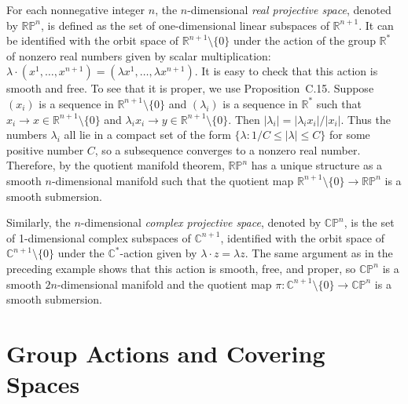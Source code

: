 \begin{example}\label{ex:real-projective-spaces}

For each nonnegative integer $n$, the $n$-dimensional \textit{real projective space}, denoted by $\mathbb{RP}^n$, is defined as the set of one-dimensional linear subspaces of $\mathbb{R}^{n+1}$. It can be identified with the orbit space of $\mathbb{R}^{n+1} \setminus \{0\}$ under the action of the group $\mathbb{R}^*$ of nonzero real numbers given by scalar multiplication: $\lambda \cdot (x^1, \ldots, x^{n+1}) = (\lambda x^1, \ldots, \lambda x^{n+1})$. It is easy to check that this action is smooth and free. To see that it is proper, we use Proposition~C.15. Suppose $(x_i)$ is a sequence in $\mathbb{R}^{n+1} \setminus \{0\}$ and $(\lambda_i)$ is a sequence in $\mathbb{R}^*$ such that $x_i \to x \in \mathbb{R}^{n+1} \setminus \{0\}$ and $\lambda_i x_i \to y \in \mathbb{R}^{n+1} \setminus \{0\}$. Then $|\lambda_i| = |\lambda_i x_i|/|x_i|$. Thus the numbers $\lambda_i$ all lie in a compact set of the form $\{\lambda : 1/C \le |\lambda| \le C\}$ for some positive number $C$, so a subsequence converges to a nonzero real number. Therefore, by the quotient manifold theorem, $\mathbb{RP}^n$ has a unique structure as a smooth $n$-dimensional manifold such that the quotient map $\mathbb{R}^{n+1} \setminus \{0\} \to \mathbb{RP}^n$ is a smooth submersion.
\end{example}

\begin{example}\label{ex:complex-projective-spaces}

Similarly, the $n$-dimensional \textit{complex projective space}, denoted by $\mathbb{CP}^n$, is the set of 1-dimensional complex subspaces of $\mathbb{C}^{n+1}$, identified with the orbit space of $\mathbb{C}^{n+1} \setminus \{0\}$ under the $\mathbb{C}^*$-action given by $\lambda \cdot z = \lambda z$. The same argument as in the preceding example shows that this action is smooth, free, and proper, so $\mathbb{CP}^n$ is a smooth $2n$-dimensional manifold and the quotient map $\pi: \mathbb{C}^{n+1} \setminus \{0\} \to \mathbb{CP}^n$ is a smooth submersion.
\end{example}

\section{Group Actions and Covering Spaces}


